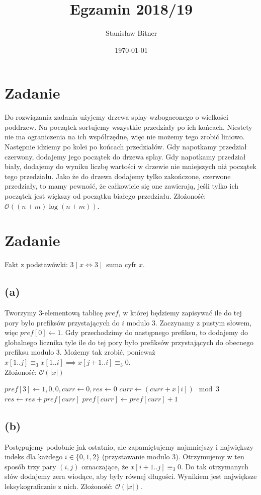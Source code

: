 \documentclass[12pt, a4paper]{article}
\title{Egzamin 2018/19}
\author{Stanisław Bitner}
\date{\today}
\newcommand{\MCALO}{\mathcal{O}}
\newcounter{zadanie}
\newcommand{\zadanie}{\addtocounter{zadanie}{1}\section*{Zadanie \arabic{zadanie}}}
\begin{document}
\maketitle
\zadanie{}
Do rozwiązania zadania użyjemy drzewa splay wzbogaconego o wielkości poddrzew.
Na początek sortujemy wszystkie przedziały po ich końcach. Niestety nie ma
ograniczenia na ich współrzędne, więc nie możemy tego zrobić liniowo. Następnie
idziemy po kolei po końcach przedziałów. Gdy napotkamy przedział czerwony,
dodajemy jego początek do drzewa splay. Gdy napotkamy przedział biały, dodajemy
do wyniku liczbę wartości w drzewie nie mniejszych niż początek tego
przedziału. Jako że do drzewa dodajemy tylko zakończone, czerwone przedziały,
to mamy pewność, że całkowicie się one zawierają, jeśli tylko ich początek jest
większy od początku białego przedziału. Złożoność: $\MCALO((n+m)\log{(n+m)})$.

\zadanie{}
Fakt z podstawówki: $3 \mid x \iff 3 \mid $ suma cyfr $x$.
\subsection*{(a)}
Tworzymy $3$-elementową tablicę $\mathit{pref}$, w której będziemy zapisywać
ile do tej pory było prefiksów przystających do $i$ modulo $3$. Zaczynamy
z pustym słowem, więc $pref[0] \gets 1$. Gdy przechodzimy do następnego
prefiksu, to dodajemy do globalnego licznika tyle ile do tej pory było
prefiksów przystających do obecnego prefiksu modulo $3$. Możemy tak zrobić,
ponieważ $x[1..j] \equiv_3 x[1..i] \implies x[j+1..i] \equiv_3 0$.\\
Złożoność: $\MCALO(|x|)$

\begin{algorithmic}

  \State $pref[3] \gets {1,0,0}, curr \gets 0, res \gets 0$
    \State $curr \gets (curr + x[i]) \mod 3$
    \State $res \gets res + pref[curr]$
    \State $pref[curr] \gets pref[curr] + 1$
  \EndFor
\EndFunction

\end{algorithmic}

\subsection*{(b)}
Postępujemy podobnie jak ostatnio, ale zapamiętujemy najmniejszy i największy
indeks dla każdego $i\in\{0,1,2\}$ (przystawanie modulo $3$). Otrzymujemy w ten
sposób trzy pary $(i,j)$ oznaczające, że $x[i+1..j] \equiv_3 0$. Do tak
otrzymanych słów dodajemy zera wiodące, aby były równej długości. Wynikiem jest
największe leksykograficznie z nich.
Złożoność: $\MCALO(|x|)$.
\end{document}

